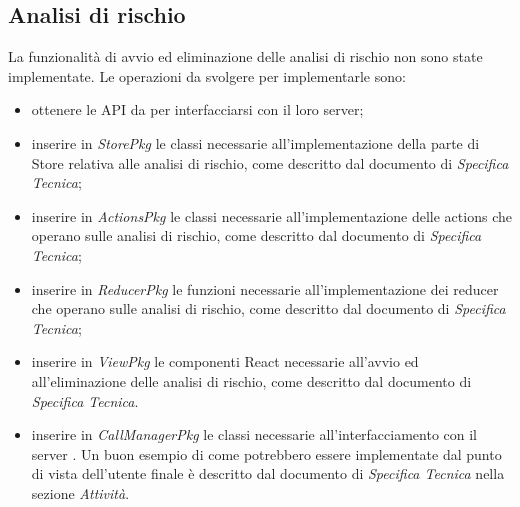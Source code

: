 \subsection{Analisi di rischio}
La funzionalità di avvio ed eliminazione delle analisi di rischio non sono state implementate. Le operazioni da svolgere per implementarle sono:
\begin{itemize}
	\item ottenere le API da \riskapp{} per interfacciarsi con il loro server;
	\item inserire in \textit{StorePkg} le classi necessarie all'implementazione della parte di Store relativa alle analisi di rischio, come descritto dal documento di \textit{Specifica Tecnica};
	\item inserire in \textit{ActionsPkg} le classi necessarie all'implementazione delle actions che operano sulle analisi di rischio, come descritto dal documento di \textit{Specifica Tecnica};
	\item inserire in \textit{ReducerPkg} le funzioni necessarie all'implementazione dei reducer che operano sulle analisi di rischio, come descritto dal documento di \textit{Specifica Tecnica};
	\item inserire in \textit{ViewPkg} le componenti React necessarie all'avvio ed all'eliminazione delle analisi di rischio, come descritto dal documento di \textit{Specifica Tecnica}.
	\item inserire in \textit{CallManagerPkg} le classi necessarie all'interfacciamento con il server \riskapp{}.
	Un buon esempio di come potrebbero essere implementate dal punto di vista dell'utente finale è descritto dal documento di \textit{Specifica Tecnica} nella sezione \textit{Attività}.
\end{itemize}

